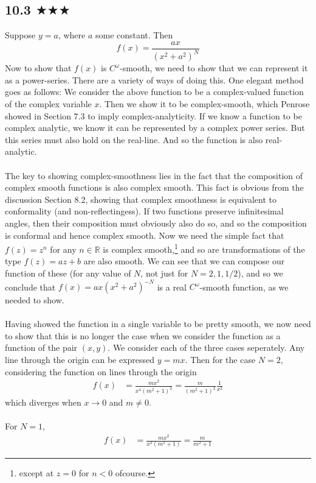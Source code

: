 \subsection{10.3 $\bigstar\bigstar\bigstar$}
Suppose $y=a$, where $a$ some constant. Then
$$f(x)=\frac{ax}{(x^2+a^2)^N}$$
Now to show that $f(x)$ is $C^\omega$-smooth, we need to show that we can represent it as a power-series. There are a variety of ways of doing this. One elegant method goes as follows: We consider the above function to be a complex-valued function of the complex variable $x$. Then we show it to be complex-smooth, which Penrose showed in Section 7.3 to imply complex-analyticity. If we know a function to be complex analytic, we know it can be represented by a complex power series. But this series must also hold on the real-line. And so the function is also real-analytic. \\ \\ The key to showing complex-smoothness lies in the fact that the composition of complex smooth functions is also complex smooth. This fact is obvious from the discussion Section 8.2, showing that complex smoothness is equivalent to conformality (and non-reflectingess). If two functions preserve infinitesimal angles, then their composition must obviously also do so, and so the composition is conformal and hence complex smooth. Now we need the simple fact that $f(z)=z^n$ for any $n\in \mathbb{R}$ is complex smooth,\footnote{except at $z=0$ for $n<0$ ofcourse.} and so are transformations of the type $f(z)=az+b$ are also smooth. We can see that we can compose our function  of these (for any value of $N$, not just for $N=2,1,1/2$), and so we conclude that $f(x)=ax(x^2+a^2)^{-N}$ is a real $C^\omega$-smooth function, as we needed to show.  \\ \\
Having showed the function in a single variable to be pretty smooth, we now need to show that this is no longer the case when we consider the function as a function of the pair $(x,y)$. We consider each of the three cases seperately. Any line through the origin can be expressed $y=mx$. Then for the case $N=2$, considering the function on lines through the origin 
\begin{align*}
f(x)&=\frac{mx^2}{x^4(m^2+1)^2}=\frac{m}{(m^2+1)^2}\frac{1}{x^2}
\end{align*}
which diverges when $x\to 0$ and $m\neq 0$.\\ \\ For $N=1$,
\begin{align*}
f(x)&=\frac{mx^2}{x^2(m^2+1)}=\frac{m}{m^2+1}
\end{align*}
